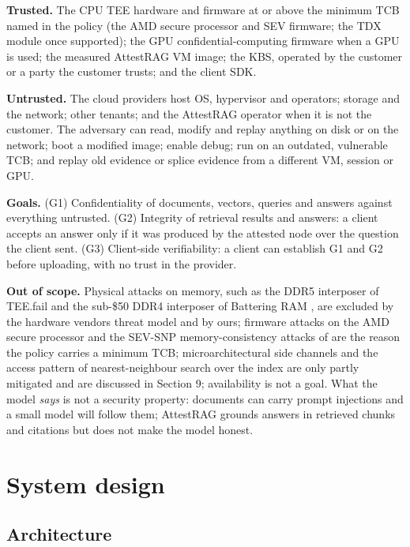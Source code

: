 \documentclass[letterpaper,twocolumn,10pt]{article}
\begin{document}
\textbf{Trusted.} The CPU TEE hardware and firmware at or above the minimum TCB named in the policy (the AMD secure processor and SEV firmware; the TDX module once supported); the GPU confidential-computing firmware when a GPU is used; the measured AttestRAG VM image; the KBS, operated by the customer or a party the customer trusts; and the client SDK.

\textbf{Untrusted.} The cloud provider\textquotesingle s host OS, hypervisor and operators; storage and the network; other tenants; and the AttestRAG operator when it is not the customer. The adversary can read, modify and replay anything on disk or on the network; boot a modified image; enable debug; run on an outdated, vulnerable TCB; and replay old evidence or splice evidence from a different VM, session or GPU.

\textbf{Goals.} (G1) Confidentiality of documents, vectors, queries and answers against everything untrusted. (G2) Integrity of retrieval results and answers: a client accepts an answer only if it was produced by the attested node over the question the client sent. (G3) Client-side verifiability: a client can establish G1 and G2 before uploading, with no trust in the provider.

\textbf{Out of scope.} Physical attacks on memory, such as the DDR5 interposer of TEE.fail \cite{chuang2025teefail} and the sub-\$50 DDR4 interposer of Battering RAM \cite{demeulemeester2026batteringram}, are excluded by the hardware vendors\textquotesingle{} threat model and by ours; firmware attacks on the AMD secure processor \cite{shen2026aspbreaker} and the SEV-SNP memory-consistency attacks of \cite{schlueter2026fabricked,zhang2026stackwarp,schlueter2026staleus,schlueter2025heracles} are the reason the policy carries a minimum TCB; microarchitectural side channels and the access pattern of nearest-neighbour search over the index are only partly mitigated and are discussed in Section 9; availability is not a goal. What the model \emph{says} is not a security property: documents can carry prompt injections and a small model will follow them; AttestRAG grounds answers in retrieved chunks and citations but does not make the model honest.

\section{System design}\label{system-design}

\subsection{Architecture}\label{architecture}
\end{document}
